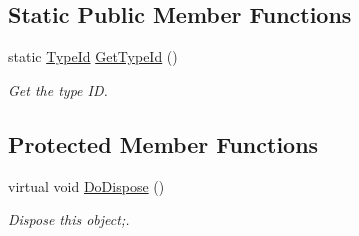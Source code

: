 \subsection*{Static Public Member Functions}
\begin{DoxyCompactItemize}
\item 
static \hyperlink{classns3_1_1TypeId}{Type\+Id} \hyperlink{classns3_1_1Ping6_af2b53e78dac0154c580bdc9797e0fd0f}{Get\+Type\+Id} ()
\begin{DoxyCompactList}\small\item\em Get the type ID. \end{DoxyCompactList}\end{DoxyCompactItemize}
\subsection*{Protected Member Functions}
\begin{DoxyCompactItemize}
\item 
virtual void \hyperlink{classns3_1_1Ping6_a455f7e0d45e50d6bfaa2fdf8812f5af4}{Do\+Dispose} ()
\begin{DoxyCompactList}\small\item\em Dispose this object;. \end{DoxyCompactList}\end{DoxyCompactItemize}
